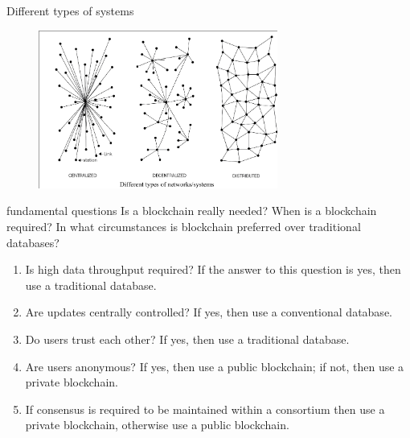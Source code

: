\documentclass[serif]{beamer}
\begin{document}
\begin{frame}{Different types of systems}
	\begin{figure}

		\includegraphics[width=0.7\textwidth]{types}
		\label{fig:4D}
	\end{figure}
\end{frame}
\begin{frame}{fundamental questions}
 Is a blockchain really needed? When is a blockchain required? In
	what circumstances is blockchain preferred over traditional databases? 
	\begin{enumerate}[<+->]
		\item Is high data throughput required? If the answer to this question is yes, then use a traditional database.
		\item Are updates centrally controlled? If yes, then use a conventional database.
		\item Do users trust each other? If yes, then use a traditional database.
		\item Are users anonymous? If yes, then use a public blockchain; if not, then use a private blockchain.
		\item If consensus is required to be maintained within a consortium then use a private blockchain, otherwise use
		a public blockchain. 
	\end{enumerate}
\end{frame}
\end{document}
